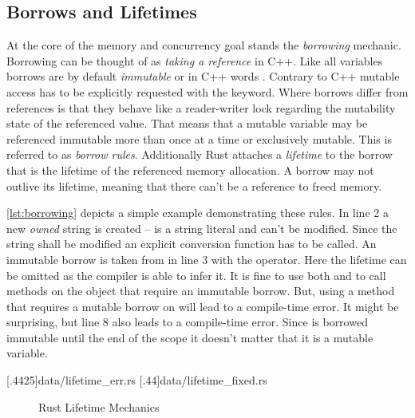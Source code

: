 \documentclass[thesis]{subfiles}
\begin{document}
  \subsection{Borrows and Lifetimes}\label{sec:rustBorr}
    At the core of the memory and concurrency goal stands the \emph{borrowing} mechanic.
    Borrowing can be thought of as \emph{taking a reference} in C++.
    Like all variables borrows are by default \emph{immutable} or in C++ words .
    Contrary to C++ mutable access has to be explicitly requested with the  keyword.
    Where borrows differ from references is that they behave like a reader-writer lock regarding the mutability state of the referenced value.
    That means that a mutable variable may be referenced immutable more than once at a time or exclusively mutable.
    This is referred to as \emph{borrow rules}.
    Additionally Rust attaches a \emph{lifetime} to the borrow that is the lifetime of the referenced memory allocation.
    A borrow may not outlive its lifetime, meaning that there can't be a reference to freed memory.


    \autoref{lst:borrowing} depicts a simple example demonstrating these rules.
    In line 2 a new \emph{owned} string is created --  is a string literal and can't be modified.
    Since the string shall be modified an explicit conversion function has to be called.
    An immutable borrow is taken from  in line 3 with the \codr{&} operator.
    Here the lifetime can be omitted as the compiler is able to infer it.
    It is fine to use both  and  to call methods on the object that require an immutable borrow.
    But, using a method that requires a mutable borrow on  will lead to a compile-time error.
    It might be surprising, but line 8 also leads to a compile-time error.
    Since  is borrowed immutable until the end of the scope it doesn't matter that it is a mutable variable.

    \LstTikzBox{\lifetimeErrBox}[.4425\linewidth]{data/lifetime_err.rs}
    \LstTikzBox{\lifetimeFixBox}[.44\linewidth]{data/lifetime_fixed.rs}
    \begin{figure}[ht]
      \captionsetup{type=lstlisting}
      \hfill%
      \caption{Rust Lifetime Mechanics}\label{lst:lifetime}
    \end{figure}
\end{document}
